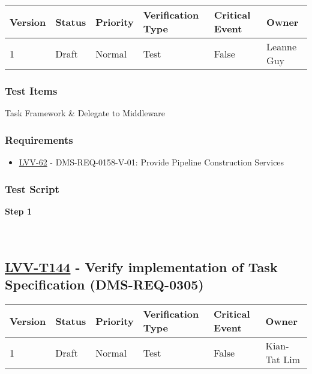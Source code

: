 \begin{longtable}[]{@{}llllll@{}}
\toprule
Version & Status & Priority & Verification Type & Critical Event &
Owner\tabularnewline
\midrule
\endhead
1 & Draft & Normal & Test & False & Leanne Guy\tabularnewline
\bottomrule
\end{longtable}

\hypertarget{test-items-43}{%
\subsubsection{Test Items}\label{test-items-43}}

Task Framework \& Delegate to Middleware

\hypertarget{requirements-43}{%
\subsubsection{Requirements}\label{requirements-43}}

\begin{itemize}
\tightlist
\item
  \href{https://jira.lsstcorp.org/browse/LVV-62}{LVV-62} -
  DMS-REQ-0158-V-01: Provide Pipeline Construction Services
\end{itemize}

\hypertarget{test-script-43}{%
\subsubsection{Test Script}\label{test-script-43}}

\textbf{Step 1}\\
~\\
~\\

\hypertarget{lvv-t144---verify-implementation-of-task-specification-dms-req-0305}{%
\subsection{\texorpdfstring{\href{https://jira.lsstcorp.org/secure/Tests.jspa\#/testCase/LVV-T144}{LVV-T144}
- Verify implementation of Task Specification
(DMS-REQ-0305)}{LVV-T144 - Verify implementation of Task Specification (DMS-REQ-0305)}}\label{lvv-t144---verify-implementation-of-task-specification-dms-req-0305}}

\begin{longtable}[]{@{}llllll@{}}
\toprule
Version & Status & Priority & Verification Type & Critical Event &
Owner\tabularnewline
\midrule
\endhead
1 & Draft & Normal & Test & False & Kian-Tat Lim\tabularnewline
\bottomrule
\end{longtable}

